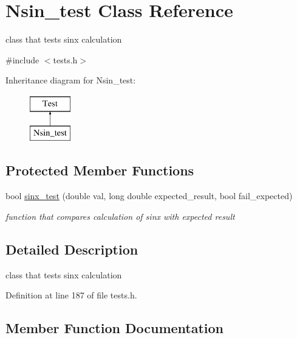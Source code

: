 \hypertarget{class_nsin__test}{}\section{Nsin\+\_\+test Class Reference}
\label{class_nsin__test}


class that tests sinx calculation  




{\ttfamily \#include $<$tests.\+h$>$}

Inheritance diagram for Nsin\+\_\+test\+:\begin{figure}[H]
\begin{center}
\leavevmode
\includegraphics[height=2.000000cm]{class_nsin__test}
\end{center}
\end{figure}
\subsection*{Protected Member Functions}
\begin{DoxyCompactItemize}
\item 
bool \mbox{\hyperlink{class_nsin__test_a2f69a91a89cc3cf5f65a4ab0d9d24538}{sinx\+\_\+test}} (double val, long double expected\+\_\+result, bool fail\+\_\+expected)
\begin{DoxyCompactList}\small\item\em function that compares calculation of sinx with expected result \end{DoxyCompactList}\end{DoxyCompactItemize}


\subsection{Detailed Description}
class that tests sinx calculation 

Definition at line 187 of file tests.\+h.



\subsection{Member Function Documentation}
\mbox{\label{class_nsin__test_a2f69a91a89cc3cf5f65a4ab0d9d24538}} 
